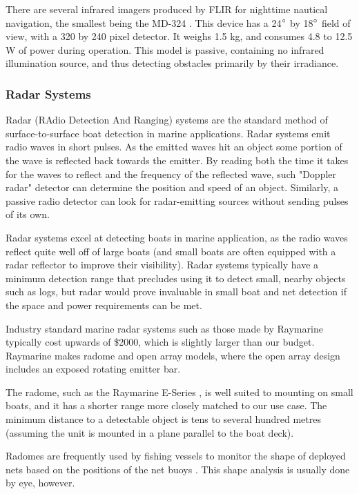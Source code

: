 There are several infrared imagers produced by FLIR for nighttime nautical navigation, the smallest being the MD-324 \cite{flir-md324}. This device has a 24$\degree$ by 18$\degree$ field of view, with a 320 by 240 pixel detector. It weighs 1.5 kg, and consumes 4.8 to 12.5 W of power during operation. This model is passive, containing no infrared illumination source, and thus detecting obstacles primarily by their irradiance.


\subsubsection{\label{sec:intro:technical-background:radar}Radar Systems}
Radar (RAdio Detection And Ranging) systems are the standard method of surface-to-surface boat detection in marine applications. Radar systems emit radio waves in short pulses. As the emitted waves hit an object some portion of the wave is reflected back towards the emitter. By reading both the time it takes for the waves to reflect and the frequency of the reflected wave,  such "Doppler radar" detector can determine the position and speed of an object. Similarly, a passive radio detector can look for radar-emitting sources without sending pulses of its own.

Radar systems excel at detecting boats in marine application, as the radio waves reflect quite well off of large boats (and small boats are often equipped with a radar reflector to improve their visibility). Radar systems typically have a minimum detection range that precludes using it to detect small, nearby objects such as logs, but radar would prove invaluable in small boat and net detection if the space and power requirements can be met.

Industry standard marine radar systems such as those made by Raymarine typically cost upwards of \$2000, which is slightly larger than our budget. Raymarine makes radome and open array models, where the open array design includes an exposed rotating emitter bar.

The radome, such as the Raymarine E-Series \cite{raymarine-eseries}, is well suited to mounting on small boats, and it has a shorter range more closely matched to our use case. The minimum distance to a detectable object is tens to several hundred metres (assuming the unit is mounted in a plane parallel to the boat deck).

Radomes are frequently used by fishing vessels to monitor the shape of deployed nets based on the positions of the net buoys \cite{furuno__marine-radar-guide}. This shape analysis is usually done by eye, however.


